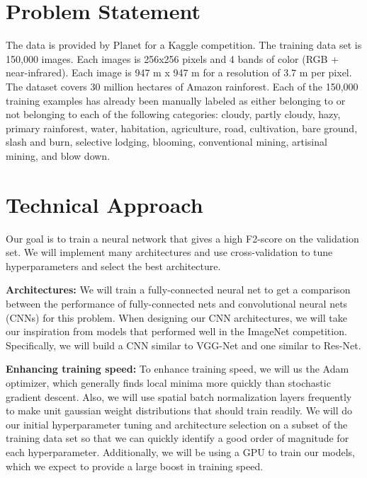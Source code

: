 \documentclass[10pt,twocolumn,letterpaper]{article}
\begin{document}
\section{Problem Statement}
The data is provided by Planet for a Kaggle competition. The training data set is 150,000 images. Each images is 256x256 pixels and 4 bands of color (RGB + near-infrared). Each image is 947 m x 947 m for a resolution of 3.7 m per pixel. The dataset covers 30 million hectares of Amazon rainforest. Each of the 150,000 training examples has already been manually labeled as either belonging to or not belonging to each of the following categories: cloudy, partly cloudy, hazy, primary rainforest, water, habitation, agriculture, road, cultivation, bare ground, slash and burn, selective lodging, blooming, conventional mining, artisinal mining, and blow down.


\section{Technical Approach}
Our goal is to train a neural network that gives a high F2-score on the validation set. We will implement many architectures and use cross-validation to tune hyperparameters and select the best architecture.

\textbf{Architectures:} We will train a fully-connected neural net to get a comparison between the performance of fully-connected nets and convolutional neural nets (CNNs) for this problem. When designing our CNN architectures, we will take our inspiration from models that performed well in the ImageNet competition. Specifically, we will build a CNN similar to VGG-Net and one similar to Res-Net.

\textbf{Enhancing training speed:} To enhance training speed, we will us the Adam optimizer, which generally finds local minima more quickly than stochastic gradient descent. Also, we will use spatial batch normalization layers frequently to make unit gaussian weight distributions that should train readily. We will do our initial hyperparameter tuning and architecture selection on a subset of the training data set so that we can quickly identify a good order of magnitude for each hyperparameter. Additionally, we will be using a GPU to train our models, which we expect to provide a large boost in training speed.
\end{document}
